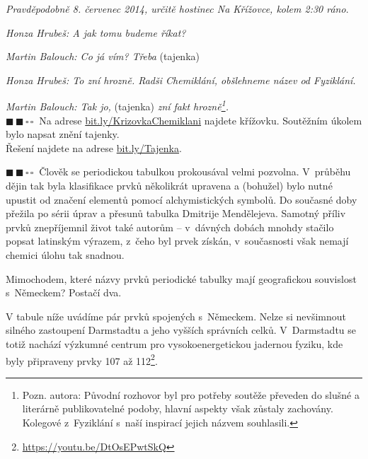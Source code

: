 \documentclass{book}
\newcommand{\dva}{$\blacksquare \, \blacksquare \, \square \, \square \; \; $}
\renewenvironment{quotation}{\par}{\par} %
\begin{document}
\hrulefill %
\begin{quotation}
\textit{Pravděpodobně 8. červenec 2014, určitě hostinec Na Křížovce,
kolem 2:30 ráno}.

\textit{Honza Hrubeš: A jak tomu budeme říkat? }

\textit{Martin Balouch: Co já vím? Třeba} (tajenka)

\textit{Honza Hrubeš: To zní hrozně. Radši Chemiklání, obšlehneme název od Fyziklání. }

\textit{Martin Balouch: Tak jo,} (tajenka) \textit{zní fakt hrozně\footnote{Pozn. autora: Původní rozhovor byl pro potřeby soutěže převeden
do slušné a literárně publikovatelné podoby, hlavní aspekty však zůstaly
zachovány. Kolegové z~Fyziklání s~naší inspirací jejich názvem souhlasili.}.}\\

\dva Na adrese \href{https://bit.ly/KrizovkaChemiklani}{bit.ly/KrizovkaChemiklani} najdete křížovku.
Soutěžním úkolem bylo napsat znění tajenky.\\Řešení najdete na adrese \href{https://bit.ly/Tajenka}{bit.ly/Tajenka}.
\end{quotation}

\hrulefill %
\begin{quotation}
\dva Člověk se periodickou tabulkou prokousával velmi pozvolna. V~průběhu
dějin tak byla klasifikace prvků několikrát upravena a (bohužel) bylo
nutné upustit od značení elementů pomocí alchymistických symbolů.
Do současné doby přežila po sérii úprav a přesunů tabulka Dmitrije
Mendělejeva. Samotný příliv prvků znepříjemnil život také autorům
-- v~dávných dobách mnohdy stačilo popsat latinským výrazem, z~čeho
byl prvek získán, v~současnosti však nemají chemici úlohu tak snadnou.\par
Mimochodem, které názvy prvků periodické tabulky mají geografickou
souvislost s~Německem? Postačí dva.
\end{quotation} \dotfill \par 

V tabule níže uvádíme pár prvků spojených s~Německem. Nelze si nevšimnout silného zastoupení Darmstadtu a jeho vyšších správních celků. V~Darmstadtu se totiž nachází výzkumné centrum pro vysokoenergetickou jadernou fyziku, kde byly připraveny prvky 107 až 112\footnote{\href{https://youtu.be/DtOsEPwtSkQ}{https://youtu.be/DtOsEPwtSkQ}}.
\end{document}
